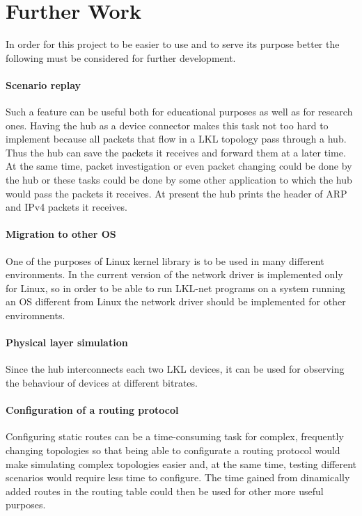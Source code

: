 \chapter{Further Work}
\label{chapter:further}
In order for this project to be easier to use and to serve its purpose better the following must be considered for further development.
\subsubsection{Scenario replay}
\label{sec:scenario-replay}
Such a feature can be useful both for educational purposes as well as for research ones. Having the hub as a device connector makes this task not too hard to implement because all packets that flow in a LKL topology pass through a hub. Thus the hub can save the packets it receives and forward them at a later time. At the same time, packet investigation or even packet changing could be done by the hub or these tasks could be done by some other application to which the hub would pass the packets it receives. At present the hub prints the header of ARP and IPv4 packets it receives.

\subsubsection{Migration to other OS}
\label{sec:migration-os}
One of the purposes of Linux kernel library is to be used in many different environments. In the current version of \project the network driver is implemented only for Linux, so in order to be able to run LKL-net programs on a system running an OS different from Linux the network driver should be implemented for other enviromnents.
\subsubsection{Physical layer simulation}
\label{sec:physica-sim}
Since the hub interconnects each two LKL devices, it can be used for observing the behaviour of devices at different bitrates.

\subsubsection{Configuration of a routing protocol}
\label{sec:routing-prot}
Configuring static routes can be a time-consuming task for complex, frequently changing topologies so that being able to configurate a routing protocol would make simulating complex topologies easier and, at the same time, testing different scenarios would require less time to configure. The time gained from dinamically added routes in the routing table could then be used for other more useful purposes.

